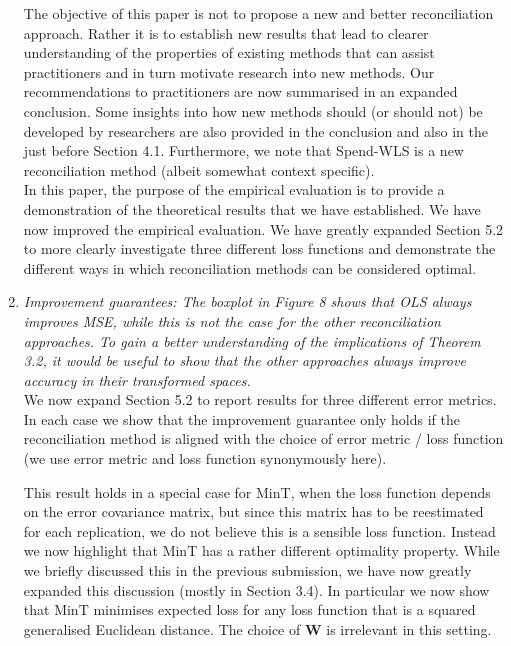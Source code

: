 \documentclass[a4paper,11pt]{article}
\begin{document}
\begin{enumerate}
        The objective of this paper is not to propose a new and better reconciliation approach.  Rather it is to establish new results that lead to clearer understanding of the properties of existing methods that can assist practitioners and in turn motivate research into new methods.  Our recommendations to practitioners are now summarised in an expanded conclusion.  Some insights into how new methods should (or should not) be developed by researchers are also provided in the conclusion and also in the just before Section 4.1.  Furthermore, we note that Spend-WLS is a new reconciliation method (albeit somewhat context specific).  \\
		
		In this paper, the purpose of the empirical evaluation is to provide a demonstration of the theoretical results that we have established.  We have now improved the empirical evaluation.  We have greatly expanded Section 5.2 to more clearly investigate three different loss functions and demonstrate the different ways in which reconciliation methods can be considered optimal.\\

		
		\item \textit{Improvement guarantees: The boxplot in Figure 8 shows that OLS always improves MSE, while this is not the case for the other reconciliation approaches. To gain a better understanding of the implications of Theorem 3.2, it would be useful to show that the other approaches always
		improve accuracy in their transformed spaces.}\\
	
	    We now expand Section 5.2 to report results for three different error metrics.  In each case we show that the improvement guarantee only holds if the reconciliation method is aligned with the choice of error metric / loss function (we use error metric and loss function synonymously here).
	
	    This result holds in a special case for MinT, when the loss function depends on the error covariance matrix, but since this matrix has to be reestimated for each replication, we do not believe this is a sensible loss function.  Instead we now highlight that MinT has a rather different optimality property.  While we briefly discussed this in the previous submission, we have now greatly expanded this discussion (mostly in Section 3.4).  In particular we now show that MinT minimises expected loss for any loss function that is a squared generalised Euclidean distance.  The choice of $\bm{W}$ is irrelevant in this setting.\\
		

\end{enumerate}
\end{document}
